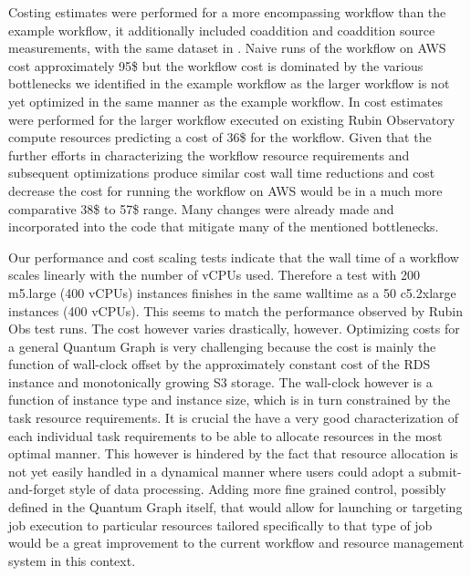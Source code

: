 \documentclass[a4paper, 10pt, conference]{ieeeconf}
\begin{document}
Costing estimates were performed for a more encompassing workflow than the example workflow, it additionally included coaddition and coaddition source measurements, with the same dataset in \cite{dmtn137}. Naive runs of the workflow on AWS cost approximately 95\$ but the workflow cost is dominated by the various bottlenecks we identified in the example workflow as the larger workflow is not yet optimized in the same manner as the example workflow. In \cite{dmtn135} cost estimates were performed for the larger workflow executed on existing Rubin Observatory compute resources predicting a cost of 36\$ for the workflow. Given that the further efforts in characterizing the workflow resource requirements and subsequent optimizations produce similar cost wall time reductions and cost decrease the cost for running the workflow on AWS would be in a much more comparative 38\$ to 57\$ range. Many changes were already made and incorporated into the code that mitigate many of the mentioned bottlenecks. 

Our performance and cost scaling tests indicate that the wall time of a workflow scales linearly with the number of vCPUs used. Therefore a test with 200 m5.large (400 vCPUs) instances finishes in the same walltime as a 50 c5.2xlarge instances (400 vCPUs). This seems to match the performance observed by Rubin Obs test runs. The cost however varies drastically, however. Optimizing costs for a general Quantum Graph is very challenging because the cost is mainly the function of wall-clock offset by the approximately constant cost of the RDS instance and monotonically growing S3 storage. The wall-clock however is a function of instance type and instance size, which is in turn constrained by the task resource requirements. It is crucial the have a very good characterization of each individual task requirements to be able to allocate resources in the most optimal manner. This however is hindered by the fact that resource allocation is not yet easily handled in a dynamical manner where users could adopt a submit-and-forget style of data processing. Adding more fine grained control, possibly defined in the Quantum Graph itself, that would allow for launching or targeting job execution to particular resources tailored specifically to that type of job would be a great improvement to the current workflow and resource management system in this context.
\end{document}
